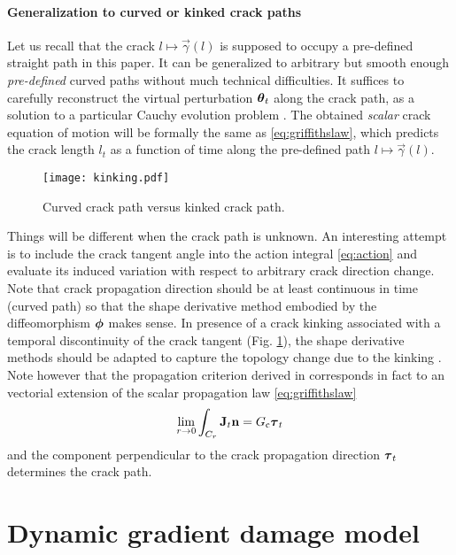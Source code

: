\paragraph{Generalization to curved or kinked crack paths} Let us recall that the crack $l\mapsto\vec{\gamma}(l)$ is supposed to occupy a pre-defined straight path in this paper. It can be generalized to arbitrary but smooth enough \emph{pre-defined} curved paths without much technical difficulties. It suffices to carefully reconstruct the virtual perturbation $\vtheta_t$ along the crack path, as a solution to a particular Cauchy evolution problem \cite{KhludnevSokolowskiSzulc:2010}. The obtained \emph{scalar} crack equation of motion will be formally the same as \eqref{eq:griffithslaw}, which predicts the crack length $l_t$ as a function of time along the pre-defined path $l\mapsto\vec{\gamma}(l)$.
\begin{figure}[htbp]
\centering
\texttt{[image: kinking.pdf]}
\caption{\small Curved crack path versus kinked crack path.} \label{fig:kinking}
\end{figure}

Things will be different when the crack path is unknown. An interesting attempt is to include the crack tangent angle into the action integral \eqref{eq:action} and evaluate its induced variation with respect to arbitrary crack direction change. Note that crack propagation direction should be at least continuous in time (curved path) so that the shape derivative method embodied by the diffeomorphism $\philt$ makes sense. In presence of a crack kinking associated with a temporal discontinuity of the crack tangent (Fig. \ref{fig:kinking}), the shape derivative methods should be adapted to capture the topology change due to the kinking \cite{Hintermuller:2011}. Note however that the propagation criterion derived in \cite{Oleaga:2001,Adda-BediaAriasAmarLund:1999} corresponds in fact to an vectorial extension of the scalar propagation law \eqref{eq:griffithslaw}
\[
\lim_{r\to 0}\int_{C_r}\vec{J}_t\vec{n}=\gc\vtau_t
\]
and the component perpendicular to the crack propagation direction $\vtau_t$ determines the crack path.

\section{Dynamic gradient damage model}
